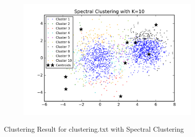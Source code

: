 \begin{description}
\begin{description}
\begin{figure}[!h]
\begin{subfigure}[b]{0.475\textwidth}
        \end{subfigure}
        \hfill
        \begin{subfigure}[b]{0.475\textwidth}   
            \centering 
            \includegraphics[width=\textwidth]{./figures/clustering_spectral_10.png}
        \end{subfigure}
        
        \caption{Clustering Result for clustering.txt with Spectral Clustering}
        \label{fig:spectral_clustering}
\end{figure}


\end{description}
\end{description}
